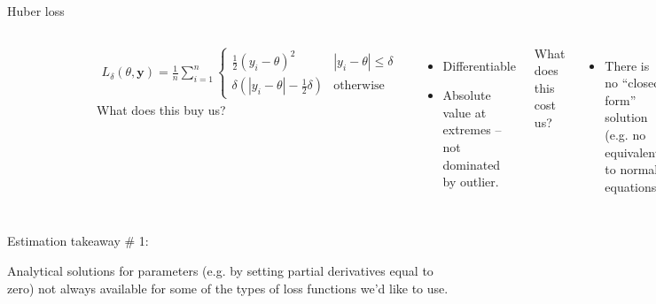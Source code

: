 \documentclass[aspectratio=169]{beamer}
\begin{document}
\begin{frame}{Huber loss}

\begin{columns}
\begin{figure}
\includegraphics[width=0.85\textwidth]{huber}
\caption*{}
\end{figure}
\vspace{-10mm}
\begin{align*}
L_\delta(\theta, \textbf{y}) = \frac{1}{n} \sum_{i=1}^n 
\begin{cases}
    \frac{1}{2}(y_i - \theta)^2 &  | y_i - \theta | \le \delta \\
    \delta ( |y_i - \theta| - \frac{1}{2}\delta ) & \text{otherwise}
\end{cases}
\end{align*}
What does this buy us?
\pause
\begin{itemize}
\item Differentiable
\item Absolute value at extremes -- not dominated by outlier.
\end{itemize}

\vspace{5mm}
\pause
What does this cost us?
\pause
\begin{itemize}
\item There is no ``closed form'' solution (e.g. no equivalent to normal equations).
\end{itemize}
\end{columns}
\end{frame}

\begin{frame}{Estimation takeaway \# 1: }

Analytical solutions for parameters (e.g. by setting partial derivatives equal to zero) not always available for some of the types of loss functions we'd like to use.
\end{frame}
\end{document}
